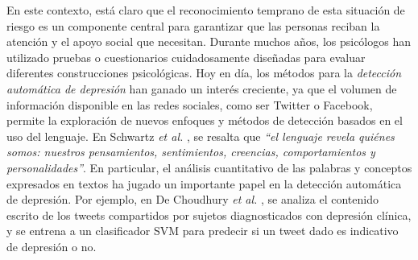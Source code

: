 En este contexto, está claro que el reconocimiento temprano de esta situación de riesgo es un componente central para garantizar que las personas reciban la atención y el apoyo social que necesitan.
Durante muchos años, los psicólogos han utilizado pruebas o cuestionarios cuidadosamente diseñadas para evaluar diferentes construcciones psicológicas.
Hoy en día, los métodos para la \emph{detección automática de depresión} han ganado un interés creciente, ya que el volumen de información disponible en las redes sociales, como ser Twitter o Facebook, permite la exploración de nuevos enfoques y métodos de detección basados en el uso del lenguaje. En Schwartz \emph{et al.} \cite{schwartz2015data}, se resalta que \emph{``el lenguaje revela quiénes somos: nuestros pensamientos, sentimientos, creencias, comportamientos y personalidades''}. En particular, el análisis cuantitativo de las palabras y conceptos expresados en textos ha jugado un importante papel en la detección automática de depresión. Por ejemplo, en De Choudhury \emph{et al.}  \cite{de2013predicting}, se analiza el contenido escrito de los tweets compartidos por sujetos diagnosticados con depresión clínica, y se entrena a un clasificador \ac{SVM} para predecir si un tweet dado es indicativo de depresión o no.

